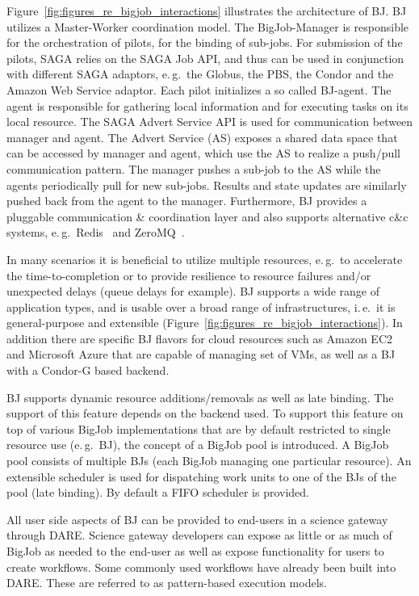 \documentclass[]{svjour3}
\begin{document}
Figure~\ref{fig:figures_re_bigjob_interactions} illustrates the
architecture of BJ. BJ utilizes a Master-Worker coordination model. The
BigJob-Manager is responsible for the orchestration of pilots, for the
binding of sub-jobs. For submission of the pilots, SAGA relies on the
SAGA Job API, and thus can be used in conjunction with different SAGA
adaptors, e.\,g.\ the Globus, the PBS, the Condor and the Amazon Web
Service adaptor. Each pilot initializes a so called BJ-agent. The
agent is responsible for gathering local information and for executing
tasks on its local resource. The SAGA Advert Service API is used for
communication between manager and agent. The Advert Service (AS)
exposes a shared data space that can be accessed by manager and agent,
which use the AS to realize a push/pull communication pattern.
The manager pushes a sub-job to the AS while the agents periodically pull
for new sub-jobs. Results and state updates are similarly pushed back from
the agent to the manager. Furthermore, BJ provides a pluggable
communication \& coordination layer and also supports alternative c\&c
systems, e.\,g.\ Redis~\cite{redis} and ZeroMQ~\cite{zmq}.

In many scenarios it is beneficial to utilize multiple resources,
e.\,g.\ to accelerate the time-to-completion or to provide resilience
to resource failures and/or unexpected delays (queue delays for example). 
BJ supports a wide range of application types, and is usable over a
broad range of infrastructures, i.\,e.\ it is general-purpose and
extensible (Figure~\ref{fig:figures_re_bigjob_interactions}). In
addition there are specific BJ flavors for cloud resources such as
Amazon EC2 and Microsoft Azure that are capable of managing set of
VMs, as well as a BJ with a Condor-G based backend.

BJ supports dynamic resource additions/removals as well as late
binding. The support of this feature depends on the backend used. To
support this feature on top of various BigJob implementations that are
by default restricted to single resource use (e.\,g.\ BJ), the concept
of a BigJob pool is introduced. A BigJob pool consists of multiple BJs
(each BigJob managing one particular resource). An extensible
scheduler is used for dispatching work units to one of the BJs of the pool
(late binding). By default a FIFO scheduler is provided.

All user side aspects of BJ can be provided to end-users
in a science gateway through DARE. Science gateway developers can
expose as little or as much of BigJob as needed to the end-user as
well as expose functionality for users to create workflows. Some
commonly used workflows have already been built into DARE. These are
referred to as pattern-based execution models.
\end{document}
